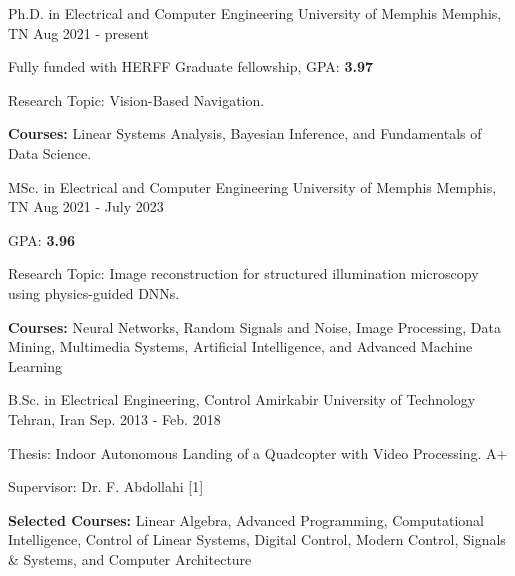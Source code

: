 

\begin{cventries}

\cventry
    {Ph.D. in Electrical and Computer Engineering} %
    {University of Memphis} %
    {Memphis, TN} %
    {Aug 2021 - present} %
    {
      \begin{cvitems} %
        \item {Fully funded with HERFF Graduate fellowship, GPA: \textbf{3.97}}
        \item {Research Topic: Vision-Based Navigation.}
        \item {\textbf{Courses:} Linear Systems Analysis, Bayesian Inference, and Fundamentals of Data Science.}
      \end{cvitems}
    }
    
  \cventry
    {MSc. in Electrical and Computer Engineering} %
    {University of Memphis} %
    {Memphis, TN} %
    {Aug 2021 - July 2023} %
    {
      \begin{cvitems} %
        \item {GPA: \textbf{3.96}}
        \item {Research Topic: Image reconstruction for structured illumination microscopy using physics-guided DNNs.}
        \item {\textbf{Courses:} Neural Networks, Random Signals and Noise, Image Processing, Data Mining, Multimedia Systems, Artificial Intelligence, and Advanced Machine Learning}
      \end{cvitems}
    }
    
  \cventry
    {B.Sc. in Electrical Engineering, Control} %
    {Amirkabir University of Technology} %
    {Tehran, Iran} %
    {Sep. 2013 - Feb. 2018} %
    {
      \begin{cvitems} %
        \item {Thesis: Indoor Autonomous Landing of a Quadcopter with Video Processing. A+} 
        \item {Supervisor: Dr. F. Abdollahi [1]} 
        \item {\textbf{Selected Courses:} Linear Algebra, Advanced Programming, Computational Intelligence, Control of Linear Systems, Digital Control, Modern Control, Signals \& Systems, and Computer Architecture}
      \end{cvitems}
        }
    

\end{cventries}
